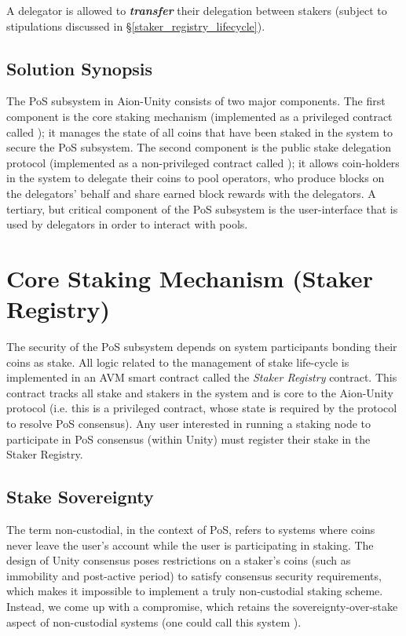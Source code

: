 A delegator is allowed to \textbf{\textit{transfer}} their delegation between stakers (subject to stipulations discussed in \S\ref{staker_registry_lifecycle}). 

\subsection{Solution Synopsis}

The PoS subsystem in Aion-Unity consists of two major components. The first component is the core staking mechanism (implemented as a privileged contract called ); it manages the state of all coins that have been staked in the system to secure the PoS subsystem. The second component is the public stake delegation protocol (implemented as a non-privileged contract called ); it allows coin-holders in the system to delegate their coins to pool operators, who produce blocks on the delegators' behalf and share earned block rewards with the delegators. A tertiary, but critical component of the PoS subsystem is the user-interface that is used by delegators in order to interact with pools. 


\section{Core Staking Mechanism (Staker Registry)}\label{staker_registry_top}

The security of the PoS subsystem depends on system participants bonding their coins as stake. All logic related to the management of stake life-cycle is implemented in an AVM smart contract called the \textit{Staker Registry} contract. This contract tracks all stake and stakers in the system and is core to the Aion-Unity protocol (i.e. this is a privileged contract, whose state is required by the protocol to resolve PoS consensus). Any user interested in running a staking node to participate in PoS consensus (within Unity) must register their stake in the Staker Registry.   


\subsection{Stake Sovereignty} \label{sovereignty}

The term non-custodial, in the context of PoS, refers to systems where coins never leave the user's account while the user is participating in staking. The design of Unity consensus \cite{WZS19} poses restrictions on a staker's coins (such as immobility and post-active period) to satisfy consensus security requirements, which makes it impossible to implement a truly non-custodial staking scheme. Instead, we come up with a compromise, which retains the sovereignty-over-stake aspect of non-custodial systems (one could call this system ).

